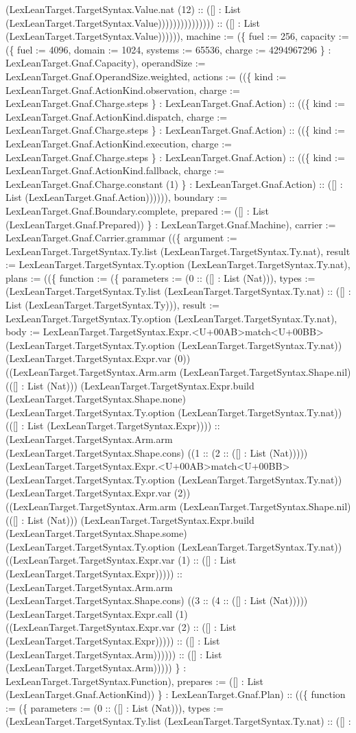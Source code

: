 \documentclass[11pt]{article}
\begin{document}
(LexLeanTarget.TargetSyntax.Value.nat (12) :: ([] : List (LexLeanTarget.TargetSyntax.Value))))))))))))))) :: ([] : List (LexLeanTarget.TargetSyntax.Value)))))), machine := (\{ fuel := 256, capacity := (\{ fuel := 4096, domain := 1024, systems := 65536, charge := 4294967296 \} : LexLeanTarget.Gnaf.Capacity), operandSize := LexLeanTarget.Gnaf.OperandSize.weighted, actions := ((\{ kind := LexLeanTarget.Gnaf.ActionKind.observation, charge := LexLeanTarget.Gnaf.Charge.steps \} : LexLeanTarget.Gnaf.Action) :: ((\{ kind := LexLeanTarget.Gnaf.ActionKind.dispatch, charge := LexLeanTarget.Gnaf.Charge.steps \} : LexLeanTarget.Gnaf.Action) :: ((\{ kind := LexLeanTarget.Gnaf.ActionKind.execution, charge := LexLeanTarget.Gnaf.Charge.steps \} : LexLeanTarget.Gnaf.Action) :: ((\{ kind := LexLeanTarget.Gnaf.ActionKind.fallback, charge := LexLeanTarget.Gnaf.Charge.constant (1) \} : LexLeanTarget.Gnaf.Action) :: ([] : List (LexLeanTarget.Gnaf.Action)))))), boundary := LexLeanTarget.Gnaf.Boundary.complete, prepared := ([] : List (LexLeanTarget.Gnaf.Prepared)) \} : LexLeanTarget.Gnaf.Machine), carrier := LexLeanTarget.Gnaf.Carrier.grammar ((\{ argument := LexLeanTarget.TargetSyntax.Ty.list (LexLeanTarget.TargetSyntax.Ty.nat), result := LexLeanTarget.TargetSyntax.Ty.option (LexLeanTarget.TargetSyntax.Ty.nat), plans := ((\{ function := (\{ parameters := (0 :: ([] : List (Nat))), types := (LexLeanTarget.TargetSyntax.Ty.list (LexLeanTarget.TargetSyntax.Ty.nat) :: ([] : List (LexLeanTarget.TargetSyntax.Ty))), result := LexLeanTarget.TargetSyntax.Ty.option (LexLeanTarget.TargetSyntax.Ty.nat), body := LexLeanTarget.TargetSyntax.Expr.<U+00AB>match<U+00BB> (LexLeanTarget.TargetSyntax.Ty.option (LexLeanTarget.TargetSyntax.Ty.nat)) (LexLeanTarget.TargetSyntax.Expr.var (0)) ((LexLeanTarget.TargetSyntax.Arm.arm (LexLeanTarget.TargetSyntax.Shape.nil) (([] : List (Nat))) (LexLeanTarget.TargetSyntax.Expr.build (LexLeanTarget.TargetSyntax.Shape.none) (LexLeanTarget.TargetSyntax.Ty.option (LexLeanTarget.TargetSyntax.Ty.nat)) (([] : List (LexLeanTarget.TargetSyntax.Expr)))) :: (LexLeanTarget.TargetSyntax.Arm.arm (LexLeanTarget.TargetSyntax.Shape.cons) ((1 :: (2 :: ([] : List (Nat))))) (LexLeanTarget.TargetSyntax.Expr.<U+00AB>match<U+00BB> (LexLeanTarget.TargetSyntax.Ty.option (LexLeanTarget.TargetSyntax.Ty.nat)) (LexLeanTarget.TargetSyntax.Expr.var (2)) ((LexLeanTarget.TargetSyntax.Arm.arm (LexLeanTarget.TargetSyntax.Shape.nil) (([] : List (Nat))) (LexLeanTarget.TargetSyntax.Expr.build (LexLeanTarget.TargetSyntax.Shape.some) (LexLeanTarget.TargetSyntax.Ty.option (LexLeanTarget.TargetSyntax.Ty.nat)) ((LexLeanTarget.TargetSyntax.Expr.var (1) :: ([] : List (LexLeanTarget.TargetSyntax.Expr))))) :: (LexLeanTarget.TargetSyntax.Arm.arm (LexLeanTarget.TargetSyntax.Shape.cons) ((3 :: (4 :: ([] : List (Nat))))) (LexLeanTarget.TargetSyntax.Expr.call (1) ((LexLeanTarget.TargetSyntax.Expr.var (2) :: ([] : List (LexLeanTarget.TargetSyntax.Expr))))) :: ([] : List (LexLeanTarget.TargetSyntax.Arm)))))) :: ([] : List (LexLeanTarget.TargetSyntax.Arm))))) \} : LexLeanTarget.TargetSyntax.Function), prepares := ([] : List (LexLeanTarget.Gnaf.ActionKind)) \} : LexLeanTarget.Gnaf.Plan) :: ((\{ function := (\{ parameters := (0 :: ([] : List (Nat))), types := (LexLeanTarget.TargetSyntax.Ty.list (LexLeanTarget.TargetSyntax.Ty.nat) :: ([] : 
\end{document}
